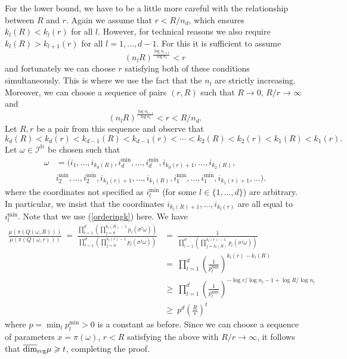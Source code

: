 \documentclass[12pt]{amsart}
\numberwithin{equation}{section}
\renewcommand{\ge}{\geqslant}
\renewcommand{\r}{\overline{\dim}_{\textup{reg}} \mu}
\begin{document}
For the lower bound, we have to be a little more careful with the relationship between $R$ and $r$.  Again we assume that $r < R/ n_d$, which ensures $k_l(R) < k_l(r)$ for all $l$.  However, for technical reasons we also require $k_l(R) > k_{l+1}(r)$ for all $l = 1, \dots, d-1$.  For this it is sufficient to assume
\[
(n_lR)^{\frac{\log n_{l+1}}{\log n_l}} < r
\]
and fortunately we can choose $r$ satisfying both of these conditions simultaneously.  This is where we use the fact that the $n_l$ are strictly increasing.  Moreover, we can choose a sequence of pairs $(r,R)$ such that $R \to 0$, $R/r \to \infty$ and
\[
(n_lR)^{\frac{\log n_{l+1}}{\log n_l}} < r< R/ n_d.
\]
Let $R,r$ be a pair from this sequence and observe that
\begin{equation} \label{orderingk}
k_d(R)< k_d(r)<k_{d-1}(R)< k_{d-1}(r)< \cdots <k_2(R)<k_2(r)<k_1(R)<k_1(r).
\end{equation}
Let $\omega \in  \mathcal{I}^{\mathbb{N}}$ be chosen such that
\begin{align*} 
\omega&= (i_1,\ldots, i_{k_d(R)}, i_d^{\text{min}},\ldots, i_d^{\text{min}}, i_{k_d(r)+1},\ldots, i_{k_2(R)},\\
&i_2^{\text{min}},\ldots , i_2^{\text{min}}, i_{k_2(r)+1},\ldots, i_{k_1(R)}, i_1^{\text{min}}, \ldots, i_1^{\text{min}}, i_{k_1(r)+1},\ldots).
\end{align*}
where the coordinates not specified as $i_l^{\text{min}}$ (for some $l \in \{1, \dots, d\}$) are arbitrary.  In particular, we insist that the coordinates $i_{k_l(R)+1}, \dots, i_{k_l(r)}$ are all equal to $i_l^{\min}$.   Note that we use (\ref{orderingk}) here.  We have
\begin{align*}
\frac{\mu(\pi(Q(\omega,R)))}{\mu(\pi(Q(\omega,r)))}  \ = \ \frac{\prod_{l=1}^d\left(\prod_{j=0}^{k_l(R)-1}p_l(\sigma^j \omega) \right)}{\prod_{l=1}^d\left(\prod_{j=0}^{k_l(r)-1}p_l(\sigma^j \omega) \right)} & =\ \frac{1}{\prod_{l=1}^d\left(\prod_{j=k_l(R)}^{k_l(r)-1}p_l(\sigma^j \omega) \right)} \\
& = \ \prod_{l=1}^d\left( \frac{1}{p_l^{\text{min}}}\right)^{k_l(r)-k_l(R)}  \\
& \ge\  \prod_{l=1}^d \left( \frac{1}{p_l^{\text{min}}}\right)^{-\log r/\log n_l -1+ \log R/\log n_l }  \\
& \ge \ p^{d} \left( \frac{R}{r} \right)^{t}
\end{align*}
where $p = \min_l p_l^{\text{min}}>0$ is a constant as before.  Since we can choose a sequence of parameters $x = \pi(\omega)$, $r<R$ satisfying the above with $R/r \to \infty$, it follows that $\r \ge t$, completing the proof.
\end{document}
